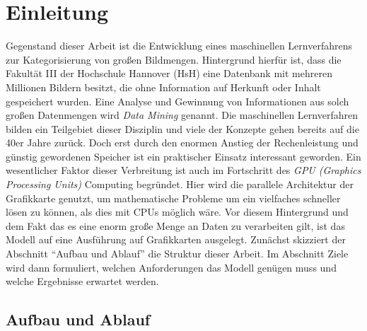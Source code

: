 \chapter{Einleitung}

Gegenstand dieser Arbeit ist die Entwicklung eines maschinellen Lernverfahrens zur Kategorisierung von großen Bildmengen. Hintergrund hierfür ist, dass die Fakultät III der Hochschule Hannover (HsH) eine Datenbank mit mehreren Millionen Bildern besitzt, die ohne Information auf Herkunft oder Inhalt gespeichert wurden. Eine Analyse und Gewinnung von Informationen aus solch großen Datenmengen wird \textit{Data Mining} genannt. Die maschinellen Lernverfahren bilden ein Teilgebiet dieser Disziplin und viele der Konzepte gehen bereits auf die 40er Jahre zurück. Doch erst durch den enormen Anstieg der Rechenleistung und günstig gewordenen Speicher ist ein praktischer Einsatz interessant geworden. 
Ein wesentlicher Faktor dieser Verbreitung ist auch im Fortschritt des \textit{GPU (Graphics Processing Units)} Computing begründet. Hier wird die parallele Architektur der Grafikkarte genutzt, um mathematische Probleme um ein vielfaches schneller lösen zu können, als dies mit CPUs möglich wäre. Vor diesem Hintergrund und dem Fakt das es eine enorm große Menge an Daten zu verarbeiten gilt, ist das Modell auf eine Ausführung auf Grafikkarten ausgelegt. \newline
Zunächst skizziert der Abschnitt \enquote{Aufbau und Ablauf} die Struktur dieser Arbeit. Im Abschnitt Ziele wird dann formuliert, welchen Anforderungen das Modell genügen muss und welche Ergebnisse erwartet werden.

\section{Aufbau und Ablauf}

